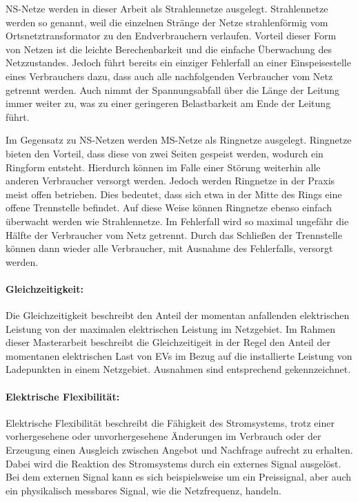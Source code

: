 \gls{NS}-Netze werden in dieser Arbeit als Strahlennetze ausgelegt.
Strahlennetze werden so genannt, weil die einzelnen Stränge der Netze strahlenförmig vom Ortsnetztransformator zu den Endverbrauchern verlaufen. \cite{Agora2019}
Vorteil dieser Form von Netzen ist die leichte Berechenbarkeit und die einfache Überwachung des Netzzustandes.
Jedoch führt bereits ein einziger Fehlerfall an einer Einspeisestelle eines Verbrauchers dazu, dass auch alle nachfolgenden Verbraucher vom Netz getrennt werden.
Auch nimmt der Spannungsabfall über die Länge der Leitung immer weiter zu, was zu einer geringeren Belastbarkeit am Ende der Leitung führt. \cite{WNG2020}\medskip

Im Gegensatz zu \gls{NS}-Netzen werden \gls{MS}-Netze als Ringnetze ausgelegt.
Ringnetze bieten den Vorteil, dass diese von zwei Seiten gespeist werden, wodurch ein Ringform entsteht.
Hierdurch können im Falle einer Störung weiterhin alle anderen Verbraucher versorgt werden.
Jedoch werden Ringnetze in der Praxis meist offen betrieben.
Dies bedeutet, dass sich etwa in der Mitte des Rings eine offene Trennstelle befindet.
Auf diese Weise können Ringnetze ebenso einfach überwacht werden wie Strahlennetze.
Im Fehlerfall wird so maximal ungefähr die Hälfte der Verbraucher vom Netz getrennt.
Durch das Schließen der Trennstelle können dann wieder alle Verbraucher, mit Ausnahme des Fehlerfalls, versorgt werden. \cite{WNG2020} \cite{Westermann2019}


\paragraph{Gleichzeitigkeit:}

Die Gleichzeitigkeit beschreibt den Anteil der momentan anfallenden elektrischen Leistung von der maximalen elektrischen Leistung im Netzgebiet. \cite{Agora2019} 
Im Rahmen dieser Masterarbeit beschreibt die Gleichzeitigeit in der Regel den Anteil der momentanen elektrischen Last von \glspl{EV} im Bezug auf die installierte Leistung von Ladepunkten in einem Netzgebiet.
Ausnahmen sind entsprechend gekennzeichnet.


\paragraph{Elektrische Flexibilität:}

Elektrische Flexibilität beschreibt die Fähigkeit des Stromsystems, trotz einer vorhergesehene oder unvorhergesehene Änderungen im Verbrauch oder der Erzeugung einen Ausgleich zwischen Angebot und Nachfrage aufrecht zu erhalten.
Dabei wird die Reaktion des Stromsystems durch ein externes Signal ausgelöst.
Bei dem externen Signal kann es sich beispielsweise um ein Preissignal, aber auch ein physikalisch messbares Signal, wie die Netzfrequenz, handeln. \medskip

